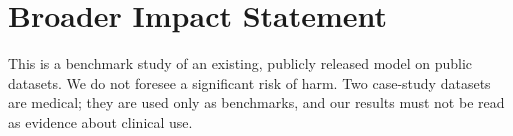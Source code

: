 \documentclass[10pt]{article}
\begin{document}
\section*{Broader Impact Statement}
This is a benchmark study of an existing, publicly released model on public datasets. We do not foresee a significant
risk of harm. Two case-study datasets are medical; they are used only as benchmarks, and our results must not be read
as evidence about clinical use.





\end{document}
